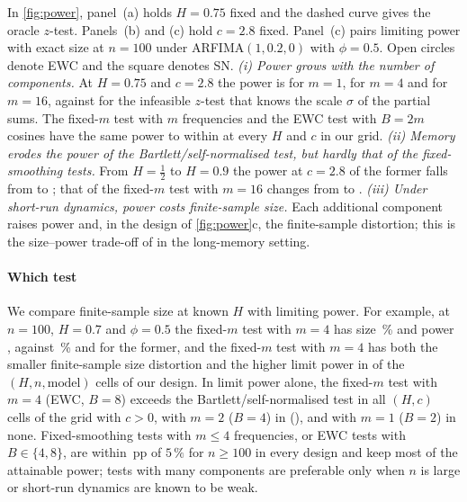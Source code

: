In \cref{fig:power}, panel~(a) holds $H=0.75$ fixed and the dashed curve gives the oracle $z$-test.
Panels~(b) and (c) hold $c=2.8$ fixed. Panel~(c) pairs limiting power with exact size at $n=100$
under ARFIMA$(1,0.2,0)$ with $\phi=0.5$. Open circles denote EWC and the square denotes SN.
\emph{(i) Power grows with the number of components.} At $H=0.75$ and $c=2.8$ the power is  for
$m=1$,  for $m=4$ and  for $m=16$, against  for the infeasible
$z$-test that knows the scale $\sigma$ of the partial sums. The fixed-$m$ test with $m$ frequencies and the EWC test with $B=2m$ cosines have the same power to within
 at every $H$ and $c$ in our grid.
\emph{(ii) Memory erodes the power of the Bartlett/self-normalised test, but hardly that of the fixed-smoothing tests.}
From $H=\frac12$ to $H=0.9$ the power at $c=2.8$ of the former falls from  to ; that
of the fixed-$m$ test with $m=16$ changes from  to .
\emph{(iii) Under short-run dynamics, power costs finite-sample size.} Each additional component raises power and,
in the design of \cref{fig:power}c, the finite-sample distortion; this is the size--power trade-off of \citet{LLS21} in the
long-memory setting.

\paragraph{Which test} We compare finite-sample size at known $H$ with limiting power. For example, at
$n=100$, $H=0.7$ and $\phi=0.5$ the fixed-$m$ test with $m=4$ has size \,\% and power
, against \,\% and  for the former, and the
fixed-$m$ test with $m=4$ has both the smaller finite-sample size distortion and the higher limit power in
 of the
 $(H,n,\text{model})$ cells of our design. In limit power alone, the fixed-$m$ test with $m=4$ (EWC, $B=8$) exceeds the
Bartlett/self-normalised test in all  $(H,c)$ cells of the grid with $c>0$, with $m=2$ ($B=4$)
in  (), and with $m=1$ ($B=2$) in none. Fixed-smoothing tests with $m\le4$ frequencies, or
EWC tests with $B\in\{4,8\}$, are within \,pp of $5\,\%$ for $n\ge100$ in every design and keep
most of the attainable power; tests with many components are preferable only when $n$ is large or short-run dynamics are
known to be weak.
